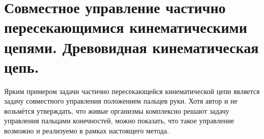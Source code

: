 \section{Совместное управление частично пересекающимися кинематическими цепями. Древовидная кинематическая цепь.}

Ярким примером задачи частично пересекающейся кинематической цепи является задачу совместного управления положением пальцев руки. Хотя автор и не возьмётся утверждать, что живые организмы комплексно решают задачу управления пальцами конечностей, можно показать, что такое управление возможно и реализуемо в рамках настоящего метода.